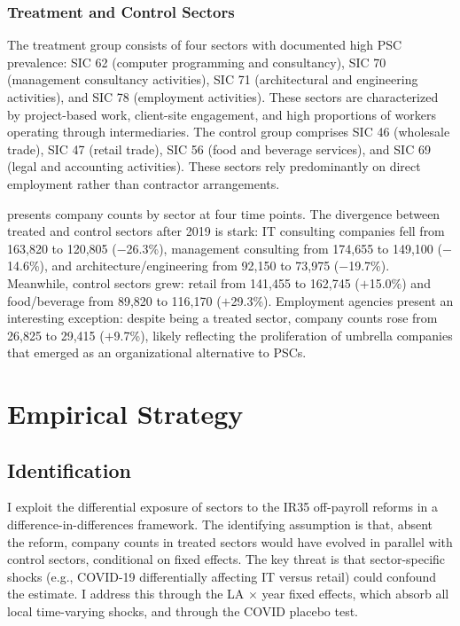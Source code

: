 \documentclass[12pt]{article}
\begin{document}
\subsubsection*{Treatment and Control Sectors} The treatment group consists of four sectors with documented high PSC prevalence: SIC 62 (computer programming and consultancy), SIC 70 (management consultancy activities), SIC 71 (architectural and engineering activities), and SIC 78 (employment activities). These sectors are characterized by project-based work, client-site engagement, and high proportions of workers operating through intermediaries. The control group comprises SIC 46 (wholesale trade), SIC 47 (retail trade), SIC 56 (food and beverage services), and SIC 69 (legal and accounting activities). These sectors rely predominantly on direct employment rather than contractor arrangements.

 presents company counts by sector at four time points. The divergence between treated and control sectors after 2019 is stark: IT consulting companies fell from 163,820 to 120,805 ($-$26.3\%), management consulting from 174,655 to 149,100 ($-$14.6\%), and architecture/engineering from 92,150 to 73,975 ($-$19.7\%). Meanwhile, control sectors grew: retail from 141,455 to 162,745 ($+$15.0\%) and food/beverage from 89,820 to 116,170 ($+$29.3\%). Employment agencies present an interesting exception: despite being a treated sector, company counts rose from 26,825 to 29,415 ($+$9.7\%), likely reflecting the proliferation of umbrella companies that emerged as an organizational alternative to PSCs.



\section{Empirical Strategy}

\subsection{Identification}

I exploit the differential exposure of sectors to the IR35 off-payroll reforms in a difference-in-differences framework. The identifying assumption is that, absent the reform, company counts in treated sectors would have evolved in parallel with control sectors, conditional on fixed effects. The key threat is that sector-specific shocks (e.g., COVID-19 differentially affecting IT versus retail) could confound the estimate. I address this through the LA $\times$ year fixed effects, which absorb all local time-varying shocks, and through the COVID placebo test.
\end{document}
